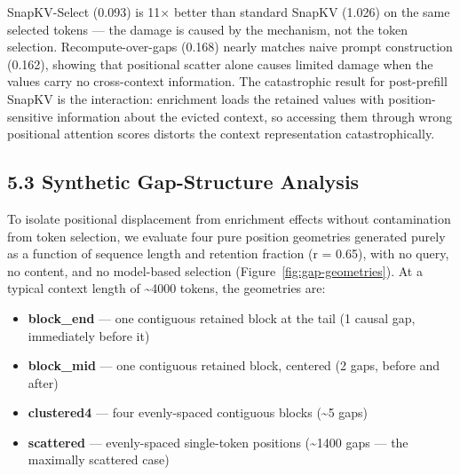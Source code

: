 \documentclass[10pt,letterpaper]{article}
\providecommand{\tightlist}{%
  \setlength{\itemsep}{0pt}\setlength{\parskip}{0pt}}
\begin{document}
SnapKV-Select (0.093) is 11× better than standard SnapKV (1.026) on
the same selected tokens --- the damage is caused by the mechanism, not
the token selection. Recompute-over-gaps (0.168) nearly matches naive
prompt construction (0.162), showing that positional scatter alone
causes limited damage when the values carry no cross-context
information. The catastrophic result for post-prefill SnapKV is the
interaction: enrichment loads the retained values with
position-sensitive information about the evicted context, so accessing
them through wrong positional attention scores distorts the context
representation catastrophically.

\hypertarget{synthetic-gap-structure-analysis}{%
\subsection{5.3 Synthetic Gap-Structure
Analysis}\label{synthetic-gap-structure-analysis}}

To isolate positional displacement from enrichment effects without
contamination from token selection, we evaluate four pure position
geometries generated purely as a function of sequence length and
retention fraction (r = 0.65), with no query, no content, and no
model-based selection (Figure~\ref{fig:gap-geometries}). At a typical
context length of \textasciitilde4000 tokens, the geometries are:

\begin{itemize}
\tightlist
\item
  \textbf{block\_end} --- one contiguous retained block at the tail (1
  causal gap, immediately before it)
\item
  \textbf{block\_mid} --- one contiguous retained block, centered (2
  gaps, before and after)
\item
  \textbf{clustered4} --- four evenly-spaced contiguous blocks
  (\textasciitilde5 gaps)
\item
  \textbf{scattered} --- evenly-spaced single-token positions
  (\textasciitilde1400 gaps --- the maximally scattered case)
\end{itemize}
\end{document}
